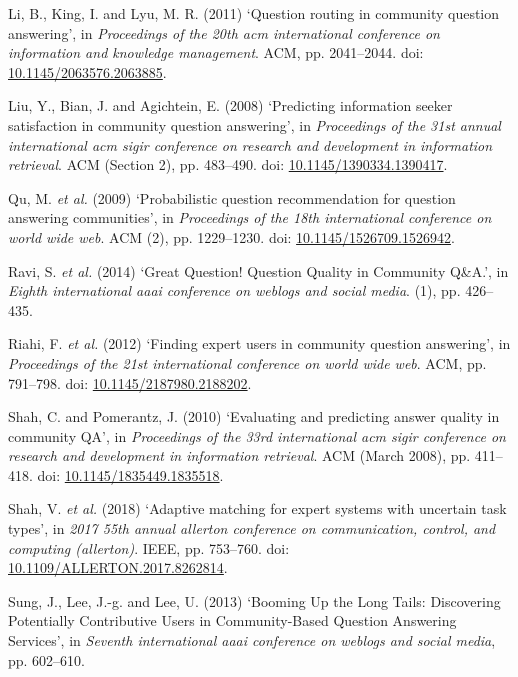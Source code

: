 \documentclass[11pt,preprint, authoryear]{article}
\numberwithin{equation}{section}
\begin{document}
\hypertarget{ref-Li2011}{}
Li, B., King, I. and Lyu, M. R. (2011) `Question routing in community
question answering', in \emph{Proceedings of the 20th acm international
conference on information and knowledge management}. ACM, pp.
2041--2044. doi:
\href{https://doi.org/10.1145/2063576.2063885}{10.1145/2063576.2063885}.

\hypertarget{ref-Liu2008}{}
Liu, Y., Bian, J. and Agichtein, E. (2008) `Predicting information
seeker satisfaction in community question answering', in
\emph{Proceedings of the 31st annual international acm sigir conference
on research and development in information retrieval}. ACM (Section 2),
pp. 483--490. doi:
\href{https://doi.org/10.1145/1390334.1390417}{10.1145/1390334.1390417}.

\hypertarget{ref-Qu2009}{}
Qu, M. \emph{et al.} (2009) `Probabilistic question recommendation for
question answering communities', in \emph{Proceedings of the 18th
international conference on world wide web}. ACM (2), pp. 1229--1230.
doi:
\href{https://doi.org/10.1145/1526709.1526942}{10.1145/1526709.1526942}.

\hypertarget{ref-Ravi2014}{}
Ravi, S. \emph{et al.} (2014) `Great Question! Question Quality in
Community Q\&A.', in \emph{Eighth international aaai conference on
weblogs and social media}. (1), pp. 426--435.

\hypertarget{ref-Riahi2012}{}
Riahi, F. \emph{et al.} (2012) `Finding expert users in community
question answering', in \emph{Proceedings of the 21st international
conference on world wide web}. ACM, pp. 791--798. doi:
\href{https://doi.org/10.1145/2187980.2188202}{10.1145/2187980.2188202}.

\hypertarget{ref-Shah2010}{}
Shah, C. and Pomerantz, J. (2010) `Evaluating and predicting answer
quality in community QA', in \emph{Proceedings of the 33rd international
acm sigir conference on research and development in information
retrieval}. ACM (March 2008), pp. 411--418. doi:
\href{https://doi.org/10.1145/1835449.1835518}{10.1145/1835449.1835518}.

\hypertarget{ref-Shah2018}{}
Shah, V. \emph{et al.} (2018) `Adaptive matching for expert systems with
uncertain task types', in \emph{2017 55th annual allerton conference on
communication, control, and computing (allerton)}. IEEE, pp. 753--760.
doi:
\href{https://doi.org/10.1109/ALLERTON.2017.8262814}{10.1109/ALLERTON.2017.8262814}.

\hypertarget{ref-Sung2013}{}
Sung, J., Lee, J.-g. and Lee, U. (2013) `Booming Up the Long Tails:
Discovering Potentially Contributive Users in Community-Based Question
Answering Services', in \emph{Seventh international aaai conference on
weblogs and social media}, pp. 602--610.
\end{document}
